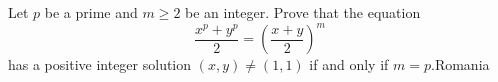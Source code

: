Let $p$ be a prime and $m \geq 2$ be an integer. Prove that the equation \[ \frac{ x^p + y^p } 2 = \left( \frac{ x+y } 2 \right)^m \]has a positive integer solution $(x, y) \neq (1, 1)$ if and only if $m = p$.Romania